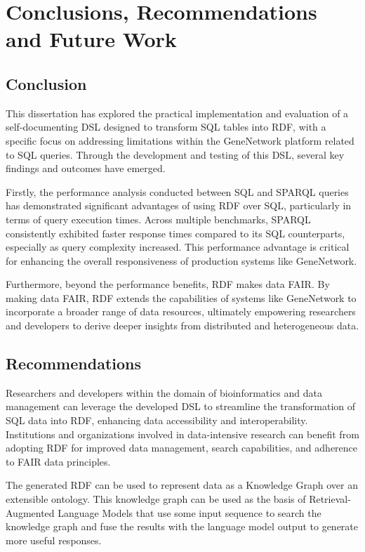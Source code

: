 \chapter{Conclusions, Recommendations and Future Work}

\section{Conclusion}

This dissertation has explored the practical implementation and evaluation of a self-documenting DSL designed to transform SQL tables into RDF, with a specific focus on addressing limitations within the GeneNetwork platform related to SQL queries. Through the development and testing of this DSL, several key findings and outcomes have emerged.

Firstly, the performance analysis conducted between SQL and SPARQL queries has demonstrated significant advantages of using RDF over SQL, particularly in terms of query execution times. Across multiple benchmarks, SPARQL consistently exhibited faster response times compared to its SQL counterparts, especially as query complexity increased. This performance advantage is critical for enhancing the overall responsiveness of production systems like GeneNetwork.

Furthermore, beyond the performance benefits, RDF makes data FAIR.  By making data FAIR, RDF extends the capabilities of systems like GeneNetwork to incorporate a broader range of data resources, ultimately empowering researchers and developers to derive deeper insights from distributed and heterogeneous data.

\section{Recommendations}

Researchers and developers within the domain of bioinformatics and data management can leverage the developed DSL to streamline the transformation of SQL data into RDF, enhancing data accessibility and interoperability. Institutions and organizations involved in data-intensive research can benefit from adopting RDF for improved data management, search capabilities, and adherence to FAIR data principles.

The generated RDF can be used to represent data as a Knowledge Graph over an extensible ontology.  This knowledge graph can be used as the basis of Retrieval-Augmented Language Models that use some input sequence to search the knowledge graph and fuse the results with the language model output to generate more useful responses.

